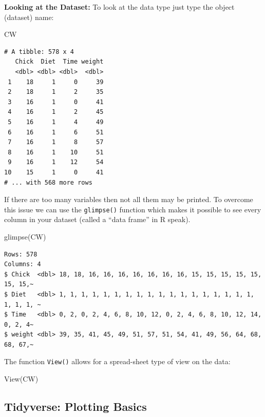 \documentclass[
  letterpaper,
  DIV=11,
  numbers=noendperiod]{scrreprt}
\newenvironment{Shaded}{\begin{snugshade}}{\end{snugshade}}
\newcommand{\FunctionTok}[1]{\textcolor[rgb]{0.28,0.35,0.67}{#1}}
\newcommand{\NormalTok}[1]{\textcolor[rgb]{0.00,0.23,0.31}{#1}}
\theoremstyle{definition}
\theoremstyle{plain}
\theoremstyle{plain}
\theoremstyle{remark}
\begin{document}
\hfill\break

\textbf{Looking at the Dataset:} To look at the data type just type the
object (dataset) name:

\begin{Shaded}
\begin{Highlighting}[]
\NormalTok{CW}
\end{Highlighting}
\end{Shaded}

\begin{verbatim}
# A tibble: 578 x 4
   Chick  Diet  Time weight
   <dbl> <dbl> <dbl>  <dbl>
 1    18     1     0     39
 2    18     1     2     35
 3    16     1     0     41
 4    16     1     2     45
 5    16     1     4     49
 6    16     1     6     51
 7    16     1     8     57
 8    16     1    10     51
 9    16     1    12     54
10    15     1     0     41
# ... with 568 more rows
\end{verbatim}

If there are too many variables then not all them may be printed. To
overcome this issue we can use the \texttt{glimpse()} function which
makes it possible to see every column in your dataset (called a ``data
frame'' in R speak).

\begin{Shaded}
\begin{Highlighting}[]
\FunctionTok{glimpse}\NormalTok{(CW)}
\end{Highlighting}
\end{Shaded}

\begin{verbatim}
Rows: 578
Columns: 4
$ Chick  <dbl> 18, 18, 16, 16, 16, 16, 16, 16, 16, 15, 15, 15, 15, 15, 15, 15,~
$ Diet   <dbl> 1, 1, 1, 1, 1, 1, 1, 1, 1, 1, 1, 1, 1, 1, 1, 1, 1, 1, 1, 1, 1, ~
$ Time   <dbl> 0, 2, 0, 2, 4, 6, 8, 10, 12, 0, 2, 4, 6, 8, 10, 12, 14, 0, 2, 4~
$ weight <dbl> 39, 35, 41, 45, 49, 51, 57, 51, 54, 41, 49, 56, 64, 68, 68, 67,~
\end{verbatim}

The function \texttt{View()} allows for a spread-sheet type of view on
the data:

\begin{Shaded}
\begin{Highlighting}[]
\FunctionTok{View}\NormalTok{(CW)}
\end{Highlighting}
\end{Shaded}

\hypertarget{tidyverse-plotting-basics}{%
\subsection{Tidyverse: Plotting
Basics}\label{tidyverse-plotting-basics}}
\end{document}
